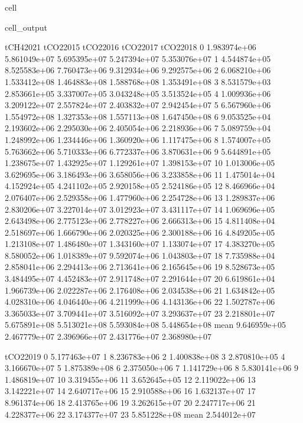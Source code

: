 \documentclass[letterpaper,10pt,english]{jupyterBook}
\begin{document}
\begin{sphinxuseclass}{cell}
\begin{sphinxVerbatimOutput}
\begin{sphinxuseclass}{cell_output}
\begin{sphinxVerbatim}[commandchars=\\\{\}]
         tCH4\PYGZus{}2021     tCO2\PYGZus{}2015     tCO2\PYGZus{}2016     tCO2\PYGZus{}2017     tCO2\PYGZus{}2018  \PYGZbs{}
0     1.983974e+06  5.861049e+07  5.695395e+07  5.247394e+07  5.353076e+07   
1     4.544874e+05  8.525583e+06  7.760473e+06  9.312934e+06  9.292575e+06   
2     6.068210e+06  1.533412e+08  1.464883e+08  1.588768e+08  1.353491e+08   
3     8.531579e+03  2.853661e+05  3.337007e+05  3.043248e+05  3.513524e+05   
4     1.009936e+06  3.209122e+07  2.557824e+07  2.403832e+07  2.942454e+07   
5     6.567960e+06  1.554972e+08  1.327353e+08  1.557113e+08  1.647450e+08   
6     9.053525e+04  2.193602e+06  2.295030e+06  2.405054e+06  2.218936e+06   
7     5.089759e+04  1.248992e+06  1.234446e+06  1.360920e+06  1.117475e+06   
8     1.574007e+05  5.763662e+06  5.710333e+06  6.772337e+06  3.870631e+06   
9     5.644891e+05  1.238675e+07  1.432925e+07  1.129261e+07  1.398153e+07   
10    1.013006e+05  3.629695e+06  3.186493e+06  3.658056e+06  3.233858e+06   
11    1.475014e+04  4.152924e+05  4.241102e+05  2.920158e+05  2.524186e+05   
12    8.466966e+04  2.076407e+06  2.529358e+06  1.477960e+06  2.254728e+06   
13    1.289837e+06  2.830206e+07  3.227014e+07  3.012923e+07  3.431117e+07   
14    1.069696e+05  2.643498e+06  2.775123e+06  2.778227e+06  2.666313e+06   
15    4.811408e+04  2.518697e+06  1.666790e+06  2.020325e+06  2.300188e+06   
16    4.849205e+05  1.213108e+07  1.486480e+07  1.343160e+07  1.133074e+07   
17    4.383270e+05  8.580052e+06  1.018389e+07  9.592074e+06  1.043803e+07   
18    7.735988e+04  2.858041e+06  2.294413e+06  2.713641e+06  2.165645e+06   
19    8.528673e+05  3.484495e+07  4.452483e+07  2.911748e+07  2.291644e+07   
20    6.619861e+04  1.966739e+06  2.022287e+06  2.176408e+06  2.034538e+06   
21    1.634842e+05  4.028310e+06  4.046440e+06  4.211999e+06  4.143136e+06   
22    1.502787e+06  3.365033e+07  3.709441e+07  3.516092e+07  3.293637e+07   
23    2.218801e+07  5.675891e+08  5.513021e+08  5.593084e+08  5.448654e+08   
mean  9.646959e+05  2.467779e+07  2.396966e+07  2.431776e+07  2.368980e+07   

         tCO2\PYGZus{}2019  
0     5.177463e+07  
1     8.236783e+06  
2     1.400838e+08  
3     2.870810e+05  
4     3.166670e+07  
5     1.875389e+08  
6     2.375050e+06  
7     1.141729e+06  
8     5.830141e+06  
9     1.486819e+07  
10    3.319455e+06  
11    3.652645e+05  
12    2.119022e+06  
13    3.142221e+07  
14    2.640717e+06  
15    2.910588e+06  
16    1.632137e+07  
17    8.961374e+06  
18    2.413765e+06  
19    3.262615e+07  
20    2.247717e+06  
21    4.228377e+06  
22    3.174377e+07  
23    5.851228e+08  
mean  2.544012e+07  
\end{sphinxVerbatim}

\end{sphinxuseclass}\end{sphinxVerbatimOutput}

\end{sphinxuseclass}
\end{document}
